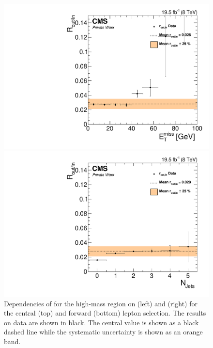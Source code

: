 \begin{figure}[htbp]
\begin{minipage}[t]{0.49\textwidth}
\end{minipage}
\begin{minipage}[t]{0.49\textwidth}
  \includegraphics[width=\textwidth]{plots/BG/rOutIn/rOutInSyst_DrellYanControlForward_Full2012_MET_HighMass_SF_None.pdf}
\end{minipage}
\begin{minipage}[t]{0.49\textwidth}
\includegraphics[width=\textwidth]{plots/BG/rOutIn/rOutInSyst_DrellYanControlForward_Full2012_NJets_HighMass_SF_None.pdf}
\end{minipage}
\caption{Dependencies of \Routin for the high-mass region on \MET (left) and \njets (right) for the central (top) and forward (bottom) lepton selection. The results on data are shown in black. The central value is shown as a black dashed line while the systematic uncertainty is shown as an orange band.}
\label{fig:ROutInDependencies2}
\end{figure} 